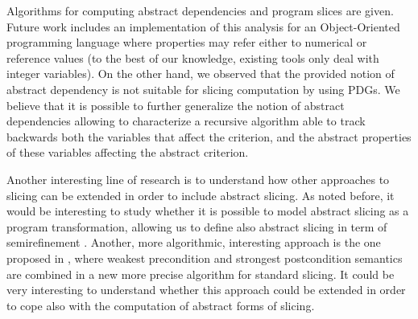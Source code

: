 \documentclass[prodmode,acmtocl]{acmsmall}
\newcommand{\0}{\mbox{\bf 0}}
\begin{document}
Algorithms for computing abstract dependencies and program slices are
given.  Future work includes an implementation of this analysis for an
Object-Oriented programming language where properties may refer either
to numerical or reference values (to the best of our knowledge,
existing tools only deal with integer variables).  On the other hand,
we observed that the provided notion of abstract dependency is not
suitable for slicing computation by using PDGs.  We believe that it is
possible to further generalize the notion of abstract dependencies
allowing to characterize a recursive algorithm able to track backwards
both the variables that affect the criterion, and the abstract
properties of these variables affecting the abstract criterion.

Another interesting line of research is to understand how other
approaches to slicing can be extended in order to include abstract
slicing.  As noted before, it would be interesting to study whether it
is possible to model abstract slicing as a program transformation,
allowing us to define also abstract slicing in term of
semirefinement \cite{WardZedan}.  Another, more algorithmic,
interesting approach is the one proposed in \cite{Barros10}, where
weakest precondition and strongest postcondition semantics are
combined in a new more precise algorithm for standard slicing.  It
could be very interesting to understand whether this approach could be
extended in order to cope also with the computation of abstract forms
of slicing.
\end{document}
